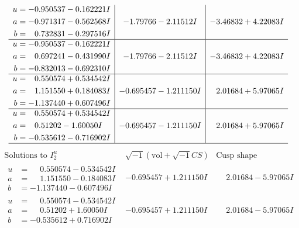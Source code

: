 \documentclass[1p]{elsarticle_modified}
\theoremstyle{definition}
\newcommand{\I}{\sqrt{-1}}
\begin{document}
$$\begin{array}{c|c|c}
\begin{aligned}
u &= -0.950537 - 0.162221 I \\
a &= -0.971317 - 0.562568 I \\
b &= \phantom{-}0.732831 - 0.297516 I\end{aligned}
 & -1.79766 - 2.11512 I & -3.46832 + 4.22083 I \\ \hline\begin{aligned}
u &= -0.950537 - 0.162221 I \\
a &= \phantom{-}0.697241 - 0.431990 I \\
b &= -0.832013 - 0.692310 I\end{aligned}
 & -1.79766 - 2.11512 I & -3.46832 + 4.22083 I \\ \hline\begin{aligned}
u &= \phantom{-}0.550574 + 0.534542 I \\
a &= \phantom{-}1.151550 + 0.184083 I \\
b &= -1.137440 + 0.607496 I\end{aligned}
 & -0.695457 - 1.211150 I & \phantom{-}2.01684 + 5.97065 I \\ \hline\begin{aligned}
u &= \phantom{-}0.550574 + 0.534542 I \\
a &= \phantom{-}0.51202 - 1.60050 I \\
b &= -0.535612 - 0.716902 I\end{aligned}
 & -0.695457 - 1.211150 I & \phantom{-}2.01684 + 5.97065 I\\
 \hline 
 \end{array}$$\newpage$$\begin{array}{c|c|c}  
\text{Solutions to }I^u_{2}& \I (\text{vol} + \sqrt{-1}CS) & \text{Cusp shape}\\
 \hline 
\begin{aligned}
u &= \phantom{-}0.550574 - 0.534542 I \\
a &= \phantom{-}1.151550 - 0.184083 I \\
b &= -1.137440 - 0.607496 I\end{aligned}
 & -0.695457 + 1.211150 I & \phantom{-}2.01684 - 5.97065 I \\ \hline\begin{aligned}
u &= \phantom{-}0.550574 - 0.534542 I \\
a &= \phantom{-}0.51202 + 1.60050 I \\
b &= -0.535612 + 0.716902 I\end{aligned}
 & -0.695457 + 1.211150 I & \phantom{-}2.01684 - 5.97065 I \\ \hline\begin{aligned}

\end{aligned}
\end{array}$$
\end{document}
